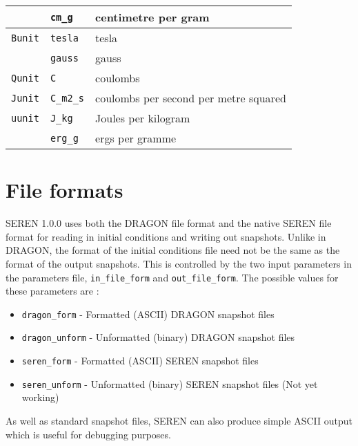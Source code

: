 \documentclass[a4paper]{article}
\newcommand{\NAME}{SEREN }
\newcommand{\VERNO}{1.0.0 }
\newcommand{\var}[1]{\texttt{#1}}
\begin{document}
\begin{center}
\begin{supertabular}{|p{3cm}|p{3cm}|p{6cm}|}
                & \var{cm\_g}     & centimetre per gram \\ 
\hline
\var{Bunit}     & \var{tesla}     & tesla \\
                & \var{gauss}     & gauss \\
\hline
\var{Qunit}     & \var{C}         & coulombs \\
\hline
\var{Junit}     & \var{C\_m2\_s}    & coulombs per second per metre squared \\
\hline
\var{uunit}     & \var{J\_kg}     & Joules per kilogram \\
                & \var{erg\_g}    & ergs per gramme \\
\end{supertabular}
\end{center}


\newpage


\section{File formats}
\NAME \VERNO uses both the DRAGON file format and the native \NAME file format for reading in initial conditions and writing out snapshots.  Unlike in DRAGON, the format of the initial conditions file need not be the same as the format of the output snapshots.  This is controlled by the two input parameters in the parameters file, \var{in\_file\_form} and \var{out\_file\_form}.  The possible values for these parameters are : 
\begin{itemize}
\item \var{dragon\_form} - Formatted (ASCII) DRAGON snapshot files
\item \var{dragon\_unform} - Unformatted (binary) DRAGON snapshot files
\item \var{seren\_form} - Formatted (ASCII) \NAME snapshot files
\item \var{seren\_unform} - Unformatted (binary) \NAME snapshot files (Not yet working)
\end{itemize}

As well as standard snapshot files, \NAME can also produce simple ASCII 
output which is useful for debugging purposes.








\end{document}
